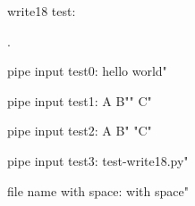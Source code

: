 
write18 test: .

pipe input test0:  hello world"

pipe input test1:  A B"" C"

pipe input test2:  A B" "C"

pipe input test3:  test-write18.py"

file name with space:  with space"
\bye